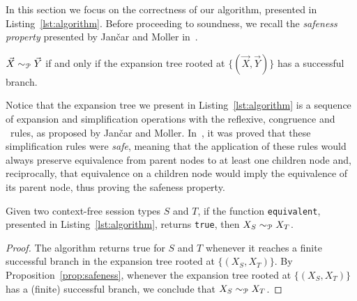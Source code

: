 In this section we focus on the correctness of our algorithm, 
presented in Listing~\ref{lst:algorithm}.
Before proceeding to soundness, we recall the \emph{safeness property} 
presented by Jan{\v{c}}ar and Moller in~\cite{janvcar1999techniques}. 

\begin{proposition} 
\label{prop:safeness}
	$\vec X \sim_{\mathcal{P}} \vec Y$ if and only if the expansion tree rooted 
	at $\{(\vec X, \vec Y)\}$ has a successful branch.
\end{proposition}

Notice that the expansion tree we present in Listing~\ref{lst:algorithm} is 
a sequence of expansion and simplification operations with the reflexive, 
congruence and \BPA\ rules, as proposed by Jan{\v{c}}ar and Moller.
In~\cite{janvcar1999techniques}, it was proved that these simplification 
rules were \emph{safe}, meaning that the application of these rules would
always preserve equivalence from parent nodes to at least one children node
and, reciprocally, that equivalence on a children node would imply the 
equivalence of its parent node, thus proving the safeness property.


\begin{theorem}
	Given two context-free session types $S$ and $T$, if the function
	\lstinline|equivalent|, presented in Listing~\ref{lst:algorithm}, 
	returns \lstinline|true|, then $X_{S} \sim_{\mathcal{P}} X_{T}$.
\end{theorem}

\begin{proof}
	The algorithm returns \textsf{true} for $S$ and $T$ whenever 
	it reaches a finite successful branch in the expansion tree rooted 
	at $\{(X_{S}, X_{T})\}$. By Proposition~\ref{prop:safeness}, whenever the 
	expansion tree rooted at $\{(X_{S}, X_{T})\}$ has a (finite) 
	successful branch, we conclude that $X_{S} \sim_{\mathcal{P}} X_{T}$.
\end{proof}

